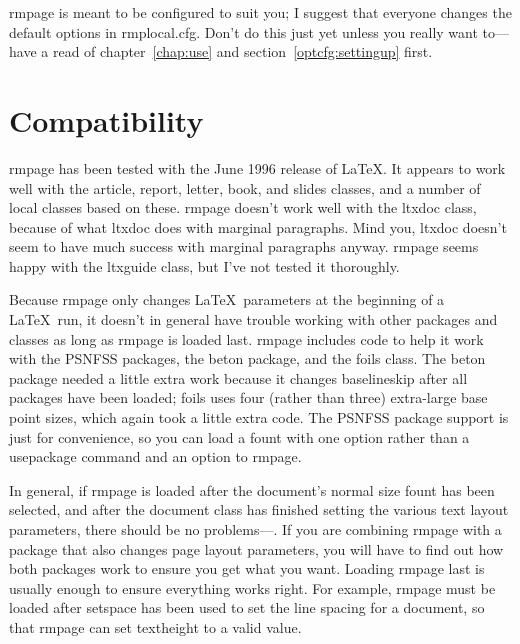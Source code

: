 \documentclass[11pt,loose,twoside,touchwider,longish,
                      noheaders,a4paper,notstdmargins]{report}
\newcommand*{\filename}[1]{{\ttfamily #1}}
\newcommand*{\packname}[1]{{\sffamily #1}}
\DeclareRobustCommand*{\comname}[1]{{\ttfamily\makeatletter\bs #1\makeatother}}
\newcommand*{\classname}[1]{{\ttfamily #1}}
\newcommand*{\rmpage}{\classname{rmpage}\xspace}
\begin{document}
\rmpage is meant to be configured to suit you; I suggest that everyone
changes the default options in \filename{rmplocal.cfg}.  Don't do this
just yet unless you really want to---have a read of
chapter~\ref{chap:use} and section~\ref{optcfg:settingup} first.


\section{Compatibility}
\label{intro:compatibility}

\rmpage has been tested with the June 1996 release of \LaTeX. It
appears to work well with the \classname{article}, \classname{report},
\classname{letter}, \classname{book}, and \classname{slides} classes,
and a number of local classes based on these.  \rmpage doesn't work
well with the \classname{ltxdoc} class, because of what
\classname{ltxdoc} does with marginal paragraphs.  Mind you,
\classname{ltxdoc} doesn't seem to have much success with marginal
paragraphs anyway.  \rmpage seems happy with the \classname{ltxguide}
class, but I've not tested it thoroughly.

Because \rmpage only changes \LaTeX\ parameters at the beginning of a
\LaTeX\ run, it doesn't in general have trouble working with other
packages and classes as long as \rmpage is loaded last.  \rmpage
includes code to help it work with the \packname{PSNFSS} packages, the
\packname{beton} package, and the \packname{foils} class.  The
\packname{beton} package needed a little extra work because it changes
\comname{baselineskip} after all packages have been loaded;
\packname{foils} uses four (rather than three) extra-large base point
sizes, which again took a little extra code.  The \packname{PSNFSS}
package support is just for convenience, so you can load a fount with
one option rather than a \comname{usepackage} command and an option
to \rmpage.

In general, if \rmpage is loaded after the document's normal size
fount has been selected, and after the document class has finished
setting the various text layout parameters, there should be no
problems---.  If you are combining \rmpage with a package that also
changes page layout parameters, you will have to find out how both
packages work to ensure you get what you want.  Loading \rmpage last
is usually enough to ensure everything works right.  For example,
\rmpage must be loaded after \packname{setspace} has been used to set
the line spacing for a document, so that \rmpage can set
\comname{textheight} to a valid value.
\end{document}
